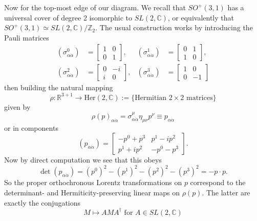 \documentclass[11pt,letterpaper]{article}
\newcommand{\LP}{\left(}
\newcommand{\RP}{\right)}
\newcommand{\R}{\mathbb{R}}
\newcommand{\C}{\mathbb{C}}
\newcommand{\Z}{\mathbb{Z}}
\begin{document}
Now for the top-most edge of our diagram. We recall that $SO^+(3,1)$ has a universal cover of degree 2 isomorphic to $SL(2,\C)$, or equivalently that $SO^+(3,1) \simeq SL(2,\C) / \Z_2$. The usual construction works by introducing the Pauli matrices \begin{equation}
\begin{aligned}
\LP \sigma^0_{\alpha \dot{\alpha}} \RP & = \begin{bmatrix}
1 & 0 \\ 0 & 1
\end{bmatrix}, & \LP \sigma^1_{\alpha \dot{\alpha}} \RP & = \begin{bmatrix}
0 & 1 \\ 1 & 0
\end{bmatrix}, \\
\LP \sigma^2_{\alpha \dot{\alpha}} \RP & = \begin{bmatrix}
0 & -i \\ i & 0
\end{bmatrix}, & \LP \sigma^3_{\alpha \dot{\alpha}} \RP & = \begin{bmatrix}
1 & 0 \\ 0 & -1
\end{bmatrix}
\end{aligned}
\end{equation}
then building the natural mapping \begin{equation}
\rho: \R^{3+1} \to \mbox{Her}(2,\C) := \{ \mbox{Hermitian } 2 \times 2 \mbox{ matrices} \}
\end{equation}
given by \begin{equation}
\rho(p)_{\alpha \dot{\alpha}} = \sigma^\mu_{\alpha \dot{\alpha}} \eta_{\mu \nu} p^\nu \equiv p_{\alpha \dot{\alpha}}
\end{equation}
or in components \begin{equation}
\LP p_{\alpha \dot{\alpha}} \RP = \begin{bmatrix}
- p^0 + p^3 & p^1 - i p^2 \\
p^1 + i p^2 & - p^0 - p^3
\end{bmatrix}.
\end{equation}
Now by direct computation we see that this obeys \begin{equation}\label{detrhop}
\det \LP p_{\alpha \dot{\alpha}} \RP = \LP p^0 \RP ^2 - \LP p^1 \RP^2 - \LP p^2 \RP^2 - \LP p^3 \RP^2 = - p \cdot p.
\end{equation}
So the proper orthochronous Lorentz transformations on $p$ correspond to the determinant- and Hermiticity-preserving linear maps on $\rho(p)$. The latter are exactly the conjugations \begin{equation}
M \mapsto A M A^\dagger \mbox{ for } A \in SL(2,\C)
\end{equation}
\end{document}
